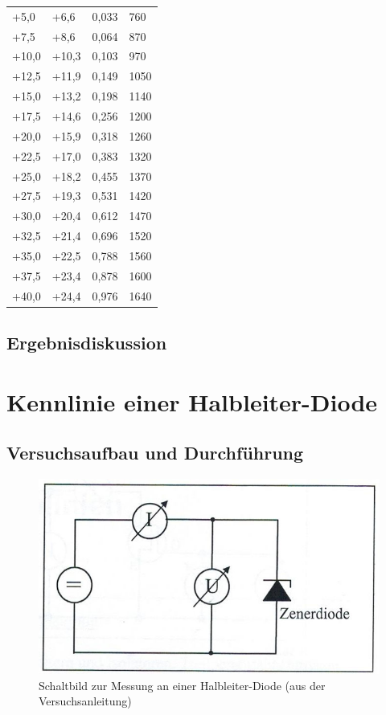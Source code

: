 \documentclass{scrartcl}
\begin{document}
\begin{table}[H]
\begin{center}
\begin{tabular}{l|l|l|l}
+5,0    &   +6,6    &   0,033   &    760 \\
+7,5    &   +8,6    &   0,064   &    870 \\
+10,0   &   +10,3   &   0,103   &    970 \\
+12,5   &   +11,9   &   0,149   &   1050 \\
+15,0   &   +13,2   &   0,198   &   1140 \\
+17,5   &   +14,6   &   0,256   &   1200 \\
+20,0   &   +15,9   &   0,318   &   1260 \\
+22,5   &   +17,0   &   0,383   &   1320 \\
+25,0   &   +18,2   &   0,455   &   1370 \\
+27,5   &   +19,3   &   0,531   &   1420 \\
+30,0   &   +20,4   &   0,612   &   1470 \\
+32,5   &   +21,4   &   0,696   &   1520 \\
+35,0   &   +22,5   &   0,788   &   1560 \\
+37,5   &   +23,4   &   0,878   &   1600 \\
+40,0   &   +24,4   &   0,976   &   1640 
\end{tabular}
\end{center}
\label{tab:Kohlefadenlampe}
\end{table}

\subsection{Ergebnisdiskussion}




\pagebreak
\section{Kennlinie einer Halbleiter-Diode}
\subsection{Versuchsaufbau und Durchführung}

\begin{figure}[H]
  \centering
    \includegraphics[scale=0.75]{Aufbau2.JPG}
  \caption{Schaltbild zur Messung an einer Halbleiter-Diode (aus der Versuchsanleitung)}
  \label{fig:Aufbau2}
\end{figure}
\end{document}
